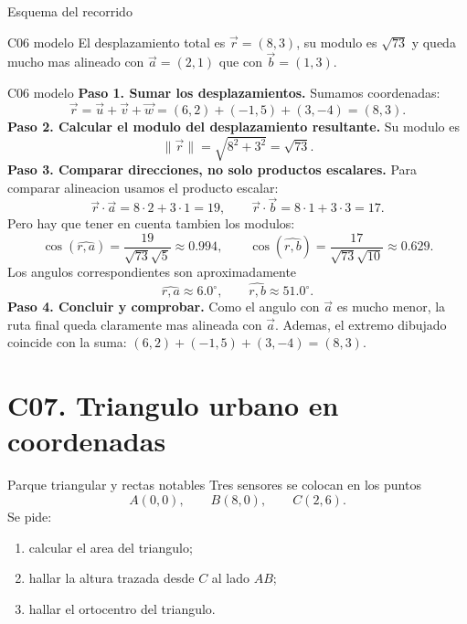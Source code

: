 \begin{databox}{Esquema del recorrido}
\begin{center}
\end{center}
\end{databox}

\begin{shortanswer}{C06 modelo}
El desplazamiento total es \(\vec r=(8,3)\), su modulo es \(\sqrt{73}\) y queda mucho mas
alineado con \(\vec a=(2,1)\) que con \(\vec b=(1,3)\).
\end{shortanswer}

\begin{fullsolution}{C06 modelo}
\textbf{Paso 1. Sumar los desplazamientos.}
Sumamos coordenadas:
\[
\vec r=\vec u+\vec v+\vec w=(6,2)+(-1,5)+(3,-4)=(8,3).
\]
\textbf{Paso 2. Calcular el modulo del desplazamiento resultante.}
Su modulo es
\[
\|\vec r\|=\sqrt{8^2+3^2}=\sqrt{73}.
\]
\textbf{Paso 3. Comparar direcciones, no solo productos escalares.}
Para comparar alineacion usamos el producto escalar:
\[
\vec r\cdot \vec a=8\cdot 2+3\cdot 1=19,
\qquad
\vec r\cdot \vec b=8\cdot 1+3\cdot 3=17.
\]
Pero hay que tener en cuenta tambien los modulos:
\[
\cos(\widehat{r,a})=\frac{19}{\sqrt{73}\sqrt{5}}\approx 0.994,
\qquad
\cos(\widehat{r,b})=\frac{17}{\sqrt{73}\sqrt{10}}\approx 0.629.
\]
Los angulos correspondientes son aproximadamente
\[
\widehat{r,a}\approx6.0^\circ,
\qquad
\widehat{r,b}\approx51.0^\circ.
\]
\textbf{Paso 4. Concluir y comprobar.} Como el angulo con \(\vec a\) es mucho menor, la ruta
final queda claramente mas alineada con \(\vec a\). Ademas, el extremo dibujado coincide con la
suma: \((6,2)+(-1,5)+(3,-4)=(8,3)\).
\end{fullsolution}

\section{C07. Triangulo urbano en coordenadas}

\begin{contextproblem}{Parque triangular y rectas notables}
Tres sensores se colocan en los puntos
\[
A(0,0),\qquad B(8,0),\qquad C(2,6).
\]
Se pide:
\begin{enumerate}
  \item calcular el area del triangulo;
  \item hallar la altura trazada desde \(C\) al lado \(AB\);
  \item hallar el ortocentro del triangulo.
\end{enumerate}
\end{contextproblem}

